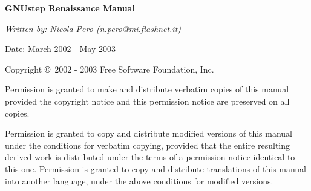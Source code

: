 %
%
%
\begin{titlepage}
\begin{flushleft}
{\phantom{begin page}}
\vskip6cm

{\LARGE\bf GNUstep Renaissance Manual\par}

\vskip1cm

{\sl Written by:  Nicola Pero (n.pero@mi.flashnet.it)

Date: March 2002 - May 2003}
\end{flushleft}

\vskip3cm

{\sc Copyright \copyright\ 2002 - 2003 Free Software Foundation, Inc.}

Permission is granted to make and distribute verbatim copies of this
manual provided the copyright notice and this permission notice are
preserved on all copies.

Permission is granted to copy and distribute modified versions of this
manual under the conditions for verbatim copying, provided that the
entire resulting derived work is distributed under the terms of a
permission notice identical to this one.  Permission is granted to
copy and distribute translations of this manual into another language,
under the above conditions for modified versions.

\end{titlepage}





